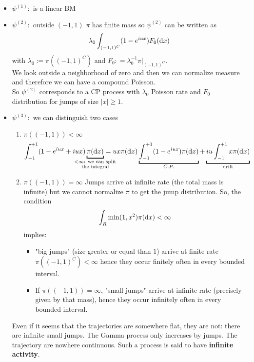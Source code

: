 \documentclass[class=article,crop=false]{standalone}
\begin{document}
\begin{itemize}
	\item $\psi^{(1)}:$ is a linear BM
	\item $\psi^{(2)}:$ outside $(-1,1)$ $\pi$ has finite mass so $\psi^{(2)}$ can be written as
	\begin{equation*}
		\lambda_0 \int_{(-1,1)^C} (1-e^{iux}) F_0(\mathop{}\!\mathrm{d} x)
	\end{equation*}
	with $\lambda_0 := \pi((-1,1)^C)$ and $F_0 : = \lambda_0^{-1} \pi |_{(-1,1)^C}$.\\ 
	We look outside a neighborhood of zero and then we can normalize measure and therefore we can have a compound Poisson. \\
	So $\psi^{(2)}$ corresponds to a CP process with $\lambda_0$ Poisson rate and $F_0$ distribution for jumps of size $|x|\geq 1$.
	\item $\psi^{(3)}:$ we can distinguish two cases
	\begin{enumerate}
		\item $\pi((-1,1)) < \infty$
		\begin{equation*}
			\int_{-1}^{+1}(1-e^{iux} + iux)\underbracket{\pi(\dif x)}_{\mathclap{\substack{<\infty\text{: we can split}\\ \text{the integral}}}} = u x \pi(\dif x)\underbracket{\int_{-1}^{+1}(1-e^{iux})\pi(\dif x)}_{C.P.} + \underbracket{iu \int_{-1}^{+1} x \pi(\dif x)}_{\text{drift}}
		\end{equation*}
		\item $\pi((-1,1)) = \infty$
		Jumps arrive at infinite rate (the total mass is infinite) but we cannot normalize $\pi$ to get the jump distribution. 
		So, the condition 
		\begin{equation*}
			\int_R \min(1,x^2) \pi(\mathop{}\!\mathrm{d} x)<\infty
		\end{equation*}
		implies:
		\begin{itemize}
			\item "big jumps" (size greater or equal than $1$) arrive at finite rate $\pi((-1,1)^C) < \infty$ hence they occur finitely often in every bounded interval. 
			\item If $\pi((-1,1)) = \infty$, "small jumps" arrive at infinite rate (precisely given by that mass), hence they occur infinitely often in every bounded interval. 
		\end{itemize}
	\end{enumerate}
	Even if it seems that the trajectories are somewhere flat, they are not: there are infinite small jumps. The Gamma process only increases by jumps. The trajectory are nowhere continuous. Such a process is said to have \textbf{infinite activity}.  
\end{itemize} 
\end{document}
